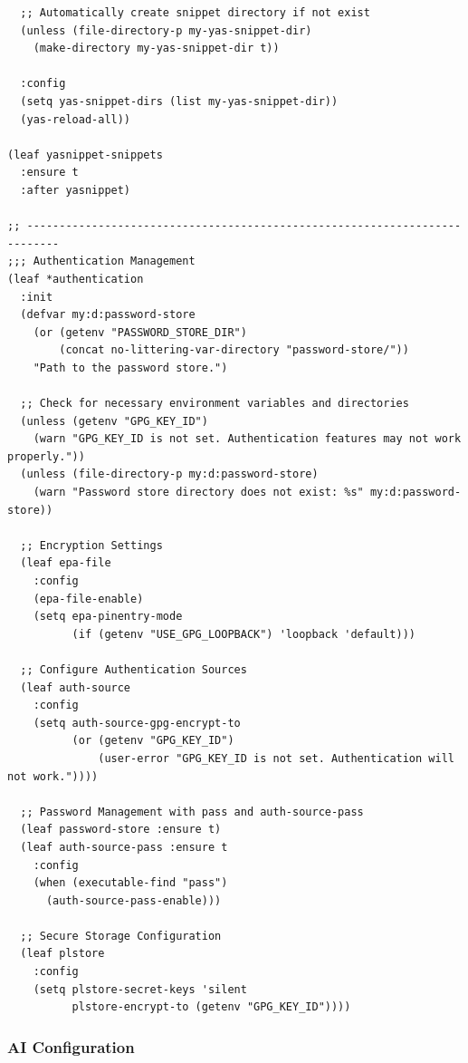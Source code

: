 \documentclass[11pt]{article}
\begin{document}
\begin{verbatim}
  ;; Automatically create snippet directory if not exist
  (unless (file-directory-p my-yas-snippet-dir)
    (make-directory my-yas-snippet-dir t))

  :config
  (setq yas-snippet-dirs (list my-yas-snippet-dir))
  (yas-reload-all))

(leaf yasnippet-snippets
  :ensure t
  :after yasnippet)

;; ---------------------------------------------------------------------------
;;; Authentication Management
(leaf *authentication
  :init
  (defvar my:d:password-store
    (or (getenv "PASSWORD_STORE_DIR")
        (concat no-littering-var-directory "password-store/"))
    "Path to the password store.")

  ;; Check for necessary environment variables and directories
  (unless (getenv "GPG_KEY_ID")
    (warn "GPG_KEY_ID is not set. Authentication features may not work properly."))
  (unless (file-directory-p my:d:password-store)
    (warn "Password store directory does not exist: %s" my:d:password-store))

  ;; Encryption Settings
  (leaf epa-file
    :config
    (epa-file-enable)
    (setq epa-pinentry-mode
          (if (getenv "USE_GPG_LOOPBACK") 'loopback 'default)))

  ;; Configure Authentication Sources
  (leaf auth-source
    :config
    (setq auth-source-gpg-encrypt-to
          (or (getenv "GPG_KEY_ID")
              (user-error "GPG_KEY_ID is not set. Authentication will not work."))))

  ;; Password Management with pass and auth-source-pass
  (leaf password-store :ensure t)
  (leaf auth-source-pass :ensure t
    :config
    (when (executable-find "pass")
      (auth-source-pass-enable)))

  ;; Secure Storage Configuration
  (leaf plstore
    :config
    (setq plstore-secret-keys 'silent
          plstore-encrypt-to (getenv "GPG_KEY_ID"))))
\end{verbatim}
\subsubsection{AI Configuration}
\label{sec:org2e48094}
\end{document}
